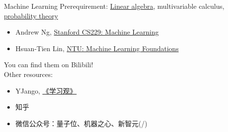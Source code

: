 \documentclass{../TexTemplate/myslide}
\begin{document}
\begin{frame}{Machine Learning}
Prerequirement: \href{http://cs229.stanford.edu/section/cs229-linalg.pdf}{Linear algebra}, multivariable calculus, \href{http://cs229.stanford.edu/section/cs229-prob.pdf}{probability theory}
\begin{itemize}
	\item Andrew Ng, \href{http://cs229.stanford.edu/}{Stanford CS229: Machine Learning}
	\item Hsuan-Tien Lin, \href{https://www.csie.ntu.edu.tw/~htlin/course/mlfound19fall/}{NTU: Machine Learning Foundations}
\end{itemize}
You can find them on Bilibili!\\\bigskip
Other resources:
\begin{itemize}
	\item YJango, \href{https://space.bilibili.com/344849038/channel/detail?cid=54015}{《学习观》}
	\item 知乎
	\item 微信公众号：量子位、机器之心、新智元(\cmark/\xmark)
\end{itemize}
\end{frame}
\end{document}
